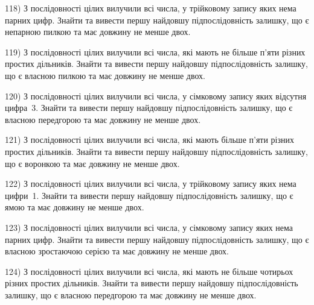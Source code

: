 \documentclass[12pt, ukrainian]{article}
\begin{document}
\par
\vspace{0.9cm}
118) \space 
З послідовності цілих вилучили всі числа, у трійковому запису яких нема парних цифр. Знайти та вивести першу найдовшу підпослідовність залишку, що є непарною пилкою та має довжину не менше двох.

\par
\vspace{0.9cm}
119) \space 
З послідовності цілих вилучили всі числа, які мають не більше п'яти різних простих дільників. Знайти та вивести першу найдовшу підпослідовність залишку, що є власною пилкою та має довжину не менше двох.

\par
\vspace{0.9cm}
120) \space 
З послідовності цілих вилучили всі числа, у сімковому запису яких відсутня цифра~3. Знайти та вивести першу найдовшу підпослідовність залишку, що є власною передгорою та має довжину не менше двох.

\par
\newpage
121) \space 
З послідовності цілих вилучили всі числа, які мають більше п'яти різних простих дільників. Знайти та вивести першу найдовшу підпослідовність залишку, що є воронкою та має довжину не менше двох.

\par
\vspace{0.9cm}
122) \space 
З послідовності цілих вилучили всі числа, у трійковому запису яких нема цифри~1. Знайти та вивести першу найдовшу підпослідовність залишку, що є ямою та має довжину не менше двох.

\par
\vspace{0.9cm}
123) \space 
З послідовності цілих вилучили всі числа, у сімковому запису яких нема парних цифр. Знайти та вивести першу найдовшу підпослідовність залишку, що є власною зростаючою серією та має довжину не менше двох.

\par
\vspace{0.9cm}
124) \space 
З послідовності цілих вилучили всі числа, які мають не більше чотирьох різних простих дільників. Знайти та вивести першу найдовшу підпослідовність залишку, що є власною передгорою та має довжину не менше двох.
\end{document}
